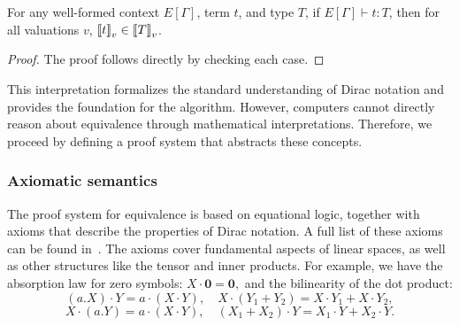 \documentclass[runningheads]{llncs}
\begin{document}
\begin{lemma}
    For any well-formed context \( E[\Gamma] \), term \( t \), and type \( T \), if \( E[\Gamma] \vdash t : T \), then for all valuations \( v \), \( {\llbracket t \rrbracket}_v \in {\llbracket T \rrbracket}_v \).
\end{lemma}

\begin{proof}
    The proof follows directly by checking each case.
\end{proof}

This interpretation formalizes the standard understanding of Dirac notation and provides the foundation for the algorithm. However, computers cannot directly reason about equivalence through mathematical interpretations. Therefore, we proceed by defining a proof system that abstracts these concepts.



\subsubsection{Axiomatic semantics} 

The proof system for equivalence is based on equational logic, together with axioms that describe the properties of Dirac notation. A full list of these axioms can be found in~. The axioms cover fundamental aspects of linear spaces, as well as other structures like the tensor and inner products. For example, we have the absorption law for zero symbols:
\(X \cdot \mathbf{0} = \mathbf{0},\)
and the bilinearity of the dot product:
\[
(a.X) \cdot Y = a \cdot (X \cdot Y), \quad X \cdot (Y_1 + Y_2) = X \cdot Y_1 + X \cdot Y_2, 
\]
\[
X \cdot (a.Y) = a \cdot (X \cdot Y), \quad (X_1 + X_2) \cdot Y = X_1 \cdot Y + X_2 \cdot Y.
\]
\end{document}
